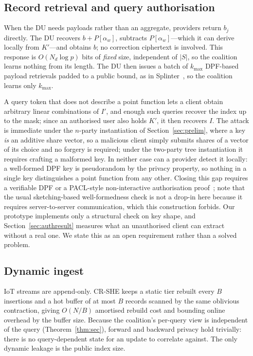 \documentclass[journal]{IEEEtran}
\begin{document}
\subsection{Record retrieval and query authorisation}
\label{sec:auth}
When the DU needs payloads rather than an aggregate, providers return $b_j$ directly. The DU recovers $b+P[\alpha_w]$, subtracts $P[\alpha_w]$---which it can derive locally from $K'$---and obtains $b$; no correction ciphertext is involved. This response is $O(N_d\log p)$ bits of \emph{fixed} size, independent of $|S|$, so the coalition learns nothing from its length. The DU then issues a batch of $k_{\max}$ DPF-based payload retrievals padded to a public bound, as in Splinter~\cite{splinter}, so the coalition learns only $k_{\max}$.

A query token that does not describe a point function lets a client obtain arbitrary linear combinations of $I'$, and enough such queries recover the index up to the mask; since an authorised user also holds $K'$, it then recovers $I$. The attack is immediate under the $n$-party instantiation of Section~\ref{sec:prelim}, where a key \emph{is} an additive share vector, so a malicious client simply submits shares of a vector of its choice and no forgery is required; under the two-party tree instantiation it requires crafting a malformed key. In neither case can a provider detect it locally: a well-formed DPF key is pseudorandom by the privacy property, so nothing in a single key distinguishes a point function from any other. Closing this gap requires a verifiable DPF or a PACL-style non-interactive authorisation proof~\cite{pacl}; note that the usual sketching-based well-formedness check is not a drop-in here because it requires server-to-server communication, which this construction forbids. Our prototype implements only a structural check on key shape, and Section~\ref{sec:authresult} measures what an unauthorised client can extract without a real one. We state this as an open requirement rather than a solved problem.

\subsection{Dynamic ingest}
IoT streams are append-only. CR-SHE keeps a static tier rebuilt every $B$ insertions and a hot buffer of at most $B$ records scanned by the same oblivious contraction, giving $O(N/B)$ amortised rebuild cost and bounding online overhead by the buffer size. Because the coalition's per-query view is independent of the query (Theorem~\ref{thm:sec}), forward and backward privacy hold trivially: there is no query-dependent state for an update to correlate against. The only dynamic leakage is the public index size.
\end{document}
